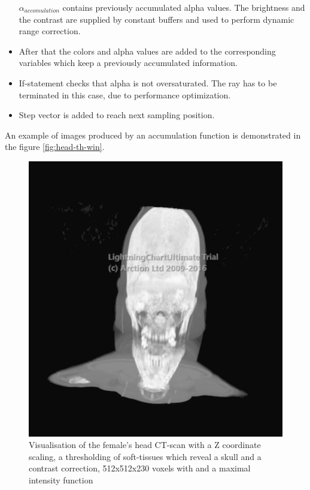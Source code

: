 \documentclass[twoside, english, 11pt]{report}
\begin{document}
\begin{itemize}
$\alpha_{accomulation}$ contains previously accumulated alpha values. The brightness and the contrast are supplied by constant buffers and used to perform dynamic range correction.
\item After that the colors and alpha values are added to the corresponding variables which keep a previously accumulated information.
\item If-statement checks that alpha is not oversaturated. The ray has to be terminated in this case, due to performance optimization.
\item Step vector is added to reach next sampling position.
\end{itemize}

An example of images produced by an accumulation function is demonstrated in the figure \ref{fig:head-th-win}. \\

\begin{figure}[!h]
\centerline{\includegraphics[scale = 0.45]{img/maxi}}
\caption{Visualisation of the female's head CT-scan with a Z coordinate scaling, a thresholding of soft-tissues which reveal a skull and a contrast correction, 512x512x230 voxels with and a maximal intensity function\label{fig:maxi}}
\end{figure}
\end{document}
